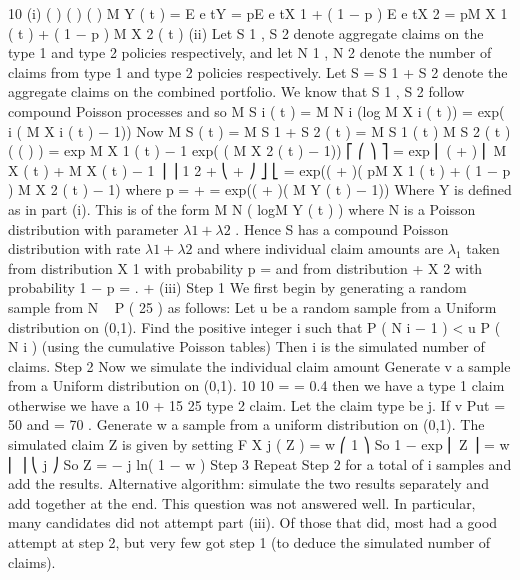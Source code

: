 \documentclass[a4paper,12pt]{article}
\begin{document}
10
(i)
( )
( )
( )
M Y ( t ) = E e tY = pE e tX 1 + ( 1 − p ) E e tX 2
= pM X 1 ( t ) + ( 1 − p ) M X 2 ( t )
(ii)
Let S 1 , S 2 denote aggregate claims on the type 1 and type 2 policies
respectively, and let N 1 , N 2 denote the number of claims from type 1 and type
2 policies respectively. Let S = S 1 + S 2 denote the aggregate claims on the
combined portfolio. We know that S 1 , S 2 follow compound Poisson processes
and so
M S i ( t ) = M N i (log M X i ( t )) = exp( \lambda  i ( M X i ( t ) − 1))
Now
M S ( t ) = M S 1 + S 2 ( t ) = M S 1 ( t ) M S 2 ( t )
( (
) )
= exp  M X 1 ( t ) − 1 exp(  ( M X 2 ( t ) − 1))
⎡
⎛ 
⎞ ⎤
= exp ⎢ (  +  ) ⎜
M X ( t ) +
M X ( t ) − 1 ⎟ ⎥
1
2
 + 
⎝  + 
⎠ ⎦
⎣
= exp((  +  )( pM X 1 ( t ) + ( 1 − p ) M X 2 ( t ) − 1) where p =
 + 
= exp((  +  )( M Y ( t ) − 1))
Where Y is defined as in part (i). This is of the form M N ( logM Y ( t ) ) where N
is a Poisson distribution with parameter $\lambda  1 + \lambda  2$ . Hence S has a compound Poisson distribution with rate $\lambda  1 + \lambda  2$ and where individual claim amounts are $\lambda_{1}$ taken from distribution X 1 with probability p =
and from distribution
 + 
X 2 with probability 1 − p =
.
 + 
(iii)
Step 1
We first begin by generating a random sample from N ~ P ( 25 ) as follows:
Let u be a random sample from a Uniform distribution on (0,1).
Find the positive integer i such that P ( N \leq  i − 1 ) < u \leq  P ( N \leq  i ) (using the
cumulative Poisson tables)
Then i is the simulated number of claims.
Step 2
Now we simulate the individual claim amount
Generate v a sample from a Uniform distribution on (0,1).
10
10
=
= 0.4 then we have a type 1 claim otherwise we have a
10 + 15 25
type 2 claim. Let the claim type be j.
If v \leq 
Put  = 50 and  = 70 . Generate w a sample from a uniform distribution on
(0,1).
The simulated claim Z is given by setting
F X j ( Z ) = w
⎛ 1 ⎞
So 1 − exp ⎜
Z ⎟ = w
⎜ \mu 
⎟
⎝ j ⎠
So Z = − \mu  j ln( 1 − w )
Step 3
Repeat Step 2 for a total of i samples and add the results.
Alternative algorithm: simulate the two results separately and add together at
the end.
This question was not answered well. In particular, many candidates did not attempt part
(iii). Of those that did, most had a good attempt at step 2, but very few got step 1 (to deduce
the simulated number of claims).
\end{document}
